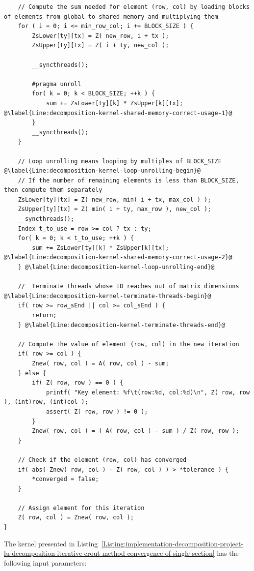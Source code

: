 \begin{lstlisting}
	// Compute the sum needed for element (row, col) by loading blocks of elements from global to shared memory and multiplying them
	for ( i = 0; i <= min_row_col; i += BLOCK_SIZE ) {
		ZsLower[ty][tx] = Z( new_row, i + tx );
		ZsUpper[ty][tx] = Z( i + ty, new_col );
		
		__syncthreads();
		
		#pragma unroll
		for( k = 0; k < BLOCK_SIZE; ++k ) {
			sum += ZsLower[ty][k] * ZsUpper[k][tx]; @\label{Line:decomposition-kernel-shared-memory-correct-usage-1}@
		}
		__syncthreads();
	}
	
	// Loop unrolling means looping by multiples of BLOCK_SIZE @\label{Line:decomposition-kernel-loop-unrolling-begin}@
	// If the number of remaining elements is less than BLOCK_SIZE, then compute them separately
	ZsLower[ty][tx] = Z( new_row, min( i + tx, max_col ) );
	ZsUpper[ty][tx] = Z( min( i + ty, max_row ), new_col );
	__syncthreads();
	Index t_to_use = row >= col ? tx : ty;
	for( k = 0; k < t_to_use; ++k ) {
		sum += ZsLower[ty][k] * ZsUpper[k][tx]; @\label{Line:decomposition-kernel-shared-memory-correct-usage-2}@
	} @\label{Line:decomposition-kernel-loop-unrolling-end}@
	
	//  Terminate threads whose ID reaches out of matrix dimensions @\label{Line:decomposition-kernel-terminate-threads-begin}@
	if( row >= row_sEnd || col >= col_sEnd ) {
		return;
	} @\label{Line:decomposition-kernel-terminate-threads-end}@
	
	// Compute the value of element (row, col) in the new iteration
	if( row >= col ) {
		Znew( row, col ) = A( row, col ) - sum;
	} else {
		if( Z( row, row ) == 0 ) {
			printf( "Key element: %f\t(row:%d, col:%d)\n", Z( row, row ), (int)row, (int)col );
			assert( Z( row, row ) != 0 );
		}
		Znew( row, col ) = ( A( row, col ) - sum ) / Z( row, row );
	}
	
	// Check if the element (row, col) has converged
	if( abs( Znew( row, col ) - Z( row, col ) ) > *tolerance ) {
		*converged = false;
	}
	
	// Assign element for this iteration
	Z( row, col ) = Znew( row, col );
}
\end{lstlisting}

The kernel presented in Listing~\ref{Listing:implementation-decomposition-project-lu-decomposition-iterative-crout-method-convergence-of-single-section} has the following input parameters:

